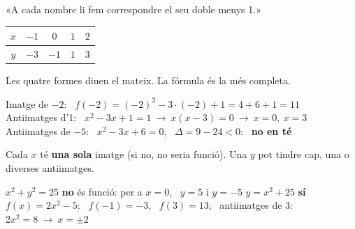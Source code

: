 \documentclass[11pt,a4paper]{article}
\newcommand{\comic}{\fontfamily{ComicNeue-TLF}\selectfont}
\newcommand{\miniax}[4]{\draw[-{Latex[length=1.5mm]},fmmuted,line width=0.6pt] (#1,0)--(#2,0); \draw[-{Latex[length=1.5mm]},fmmuted,line width=0.6pt] (0,#3)--(0,#4);}
\begin{document}
\vfill
\begin{tcbraster}[raster columns=4,raster equal height,raster column skip=6pt]
\begin{tcolorbox}[fmbase,colback=fmdefbg,colframe=fmdef,coltitle=white,title={Enunciat}]
\small«A cada nombre li fem correspondre el seu doble menys 1.»
\end{tcolorbox}
\begin{tcolorbox}[fmbase,colback=fmdefbg,colframe=fmdef,coltitle=white,title={Fórmula},before upper=\centering]
\vspace*{3mm}{\large$f(x)=2x-1$}
\end{tcolorbox}
\begin{tcolorbox}[fmbase,colback=fmdefbg,colframe=fmdef,coltitle=white,title={Taula},before upper=\centering,left=1mm,right=1mm]
\small\setlength{\tabcolsep}{3pt}\begin{tabular}{c|cccc}$x$&$-1$&$0$&$1$&$2$\\\hline $y$&$-3$&$-1$&$1$&$3$\end{tabular}
\end{tcolorbox}
\begin{tcolorbox}[fmbase,colback=fmdefbg,colframe=fmdef,coltitle=white,title={Gràfica},before upper=\centering]
\end{tcolorbox}
\end{tcbraster}
{\comic\color{fmmuted}\centering Les quatre formes diuen el mateix. La fórmula és la més completa.\par}

\vfill
\begin{exemple}[Exemple: \ $f(x)=x^2-3x+1$]
Imatge de $-2$: \ $f(-2)=(-2)^2-3\cdot(-2)+1=4+6+1=\boxed{11}$\\[4pt]
Antiimatges d'1: \ $x^2-3x+1=1\ \to\ x(x-3)=0\ \to\ \boxed{x=0,\ x=3}$\\[4pt]
Antiimatges de $-5$: \ $x^2-3x+6=0$, \ $\Delta=9-24<0$: \ \textbf{no en té}
\end{exemple}

\vfill
\begin{compte}
Cada $x$ té \textbf{una sola} imatge (si no, no seria funció). Una $y$ pot tindre cap, una o diverses antiimatges.
\end{compte}

\vfill
\begin{exemple}[Exemples]
$x^2+y^2=25$ \textbf{no} és funció: per a $x=0$, \ $y=5$ i $y=-5$ \qquad $y=x^2+25$ \textbf{sí}\\[4pt]
$f(x)=2x^2-5$: \ $f(-1)=-3$, \ $f(3)=13$; \ antiimatges de 3: \ $2x^2=8\ \to\ x=\pm2$
\end{exemple}
\end{document}
